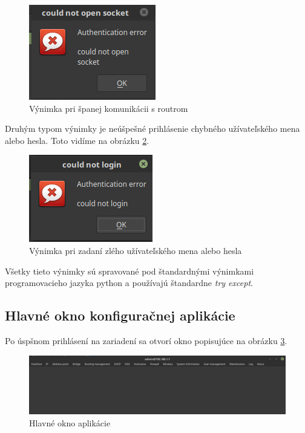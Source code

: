 \begin{figure}[H]
\centering
\includegraphics[scale=0.55]{../text/socket.png}
\caption{Výnimka pri španej komunikácii s routrom}
\label{fig:socket}
\end{figure}
Druhým typom výnimky je neúšpešné prihlásenie chybného užívateľského mena alebo hesla. Toto vidíme na obrázku \ref{fig:loginworong}.
\begin{figure}[H]
\centering
\includegraphics[scale=0.55]{../text/loginerror.png}
\caption{Výnimka pri zadaní zlého užívateľského mena alebo hesla}
\label{fig:loginworong}
\end{figure}
Všetky tieto výnimky sú spravované pod štandardnými výnimkami programovacieho jazyka python a používajú štandardne \textit{try except}.
\subsection{Hlavné okno konfiguračnej aplikácie}
Po úspšnom prihlásení na zariadení sa otvorí okno popisujúce na obrázku \ref{fig:loginokno}.
\begin{figure}[H]
\centering
\includegraphics[scale=0.35]{../text/loginokno.png}
\caption{Hlavné okno aplikácie}
\label{fig:loginokno}
\end{figure}
